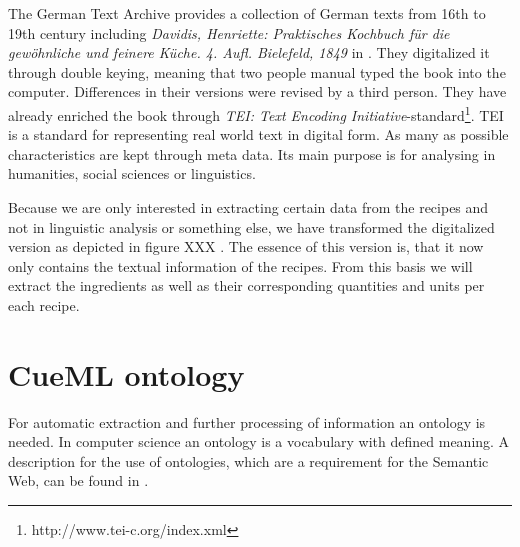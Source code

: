 \documentclass[12pt, twoside]{report}
\begin{document}
The German Text Archive provides a collection of German texts from 16th to 19th century including \textit{Davidis, Henriette: Praktisches Kochbuch für die gewöhnliche und feinere Küche. 4. Aufl. Bielefeld, 1849} in \parencite{DTA}. They digitalized it through double keying, meaning that two people manual typed the book into the computer. Differences in their versions were revised by a third person. They have already enriched the book through \textit{TEI: Text Encoding Initiative}-standard\footnote{http://www.tei-c.org/index.xml}. TEI is a standard for representing real world text in digital form. As many as possible characteristics are kept through meta data. Its main purpose is for analysing in humanities, social sciences or linguistics.

Because we are only interested in extracting certain data from the recipes and not in linguistic analysis or something else, we have transformed the digitalized version as depicted in figure XXX . The essence of this version is, that it now only contains the textual information of the recipes. From this basis we will extract the ingredients as well as their corresponding quantities and units per each recipe.

\section{CueML ontology}\label{sec:cueMLOntology}
For automatic extraction and further processing of information an ontology is needed. In computer science an ontology is a vocabulary with defined meaning. A description for the use of ontologies, which are a requirement for the Semantic Web, can be found in \parencite{semanticWeb}.
\end{document}
